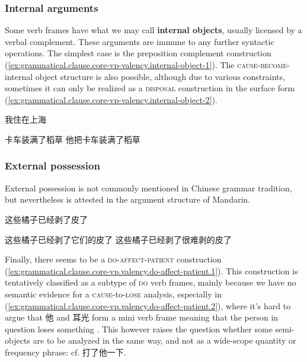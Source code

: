 \documentclass[UTF8, a4paper, oneside, scheme=plain, 12pt]{ctexrep}
\newcommand*{\concept}[1]{\textbf{#1}}
\newcommand*{\category}[1]{\textsc{#1}}
\begin{document}
\subsubsection{Internal arguments}\label{sec:grammatical.clause.core-vp.internal}

Some verb frames have what we may call \concept{internal objects}, usually licensed by a verbal complement.
These arguments are immune to any further syntactic operations.
The simplest case is the preposition complement construction (\ref{ex:grammatical.clause.core-vp-valency.internal-object-1}).
The \category{cause}-\category{become}-internal object structure is also possible,
although due to various constraints, sometimes it can only be realized as a \category{disposal} construction in the surface form (\ref{ex:grammatical.clause.core-vp-valency.internal-object-2}).


\begin{exe}
    \ex\label{ex:grammatical.clause.core-vp-valency.internal-object-1}
    我住在上海
    \ex\label{ex:grammatical.clause.core-vp-valency.internal-object-2} 
    \begin{xlist}
        \ex 卡车装满了稻草
        \ex 他把卡车装满了稻草
    \end{xlist}
\end{exe}

\subsubsection{External possession}

External possession is not commonly mentioned in Chinese grammar tradition,
but nevertheless is attested in the argument structure of Mandarin.

\begin{exe}
    \ex 这些橘子已经剥了皮了
    \ex\begin{xlist}
        \ex *这些橘子已经剥了它们的皮了
        \ex *这些橘子已经剥了很难剥的皮了
    \end{xlist}
\end{exe}

Finally, there seems to be a \category{do}-\category{affect}-\category{patient} construction
(\ref{ex:grammatical.clause.core-vp.valency.do-affect-patient.1}).
This construction is tentatively classified as a subtype of \category{do} verb frames,
mainly because we have no semantic evidence for a \category{cause}-to-\category{lose} analysis,
especially in (\ref{ex:grammatical.clause.core-vp.valency.do-affect-patient.2}),
where it's hard to argue that 他 and 耳光 form a mini verb frame meaning that the person in question loses something
\citep{huang2007}.
This however raises the question whether some semi-objects are to be analyzed in the same way,
and not as a wide-scope quantity or frequency phrase: cf. 打了他一下.
\end{document}
